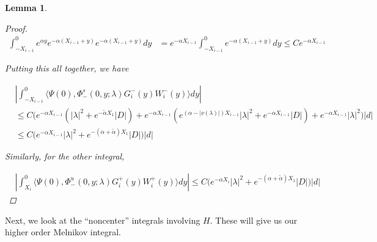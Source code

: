 \documentclass[12pt]{article}
\newtheorem{lemma}{Lemma}
\begin{document}
\begin{lemma}
\begin{proof}
\begin{align*}
\int_{-X_{i-1}}^0 e^{\alpha y} e^{-\alpha(X_{i-1} + y)} e^{-\alpha(X_{i-1} + y)} dy &= e^{-\alpha X_{i-1}} \int_{-X_{i-1}}^0 e^{-\alpha(X_{i-1} + y)} dy \leq C e^{-\alpha X_{i-1}}
\end{align*}

Putting this all together, we have

\begin{align*}
&\left| \int_{-X_{i-1}}^0 \langle \Psi(0), \Phi^s_-(0, y; \lambda) G_i^-(y) W_i^-(y) \rangle dy \right| \\
&\leq C \Big( e^{-\alpha X_{i-1}} (|\lambda|^2 + e^{-\tilde{\alpha} X_1} |D|) + e^{-\alpha X_{i-1}} (e^{(\alpha - |\nu(\lambda)|) X_{i-1}} |\lambda|^2 + e^{-\alpha X_{i-1}} |D|) + e^{-\alpha X_{i-1}} |\lambda|^2 \Big) |d| \\
&\leq C \Big( e^{-\alpha X_{i-1}} |\lambda|^2 + e^{-(\alpha + \tilde{\alpha}) X_1} |D| \Big) |d|
\end{align*}

Similarly, for the other integral,

\begin{align*}
&\left| \int_{X_i}^0 \langle \Psi(0), \Phi^u_-(0, y; \lambda) G_i^+(y) W_i^+(y) \rangle dy \right| \leq C \Big( e^{-\alpha X_i} |\lambda|^2 + e^{-(\alpha + \tilde{\alpha}) X_1} |D| \Big) |d|
\end{align*}

\end{proof}
\end{lemma}

Next, we look at the ``noncenter'' integrals involving $H$. These will give us our higher order Melnikov integral.

\end{document}
